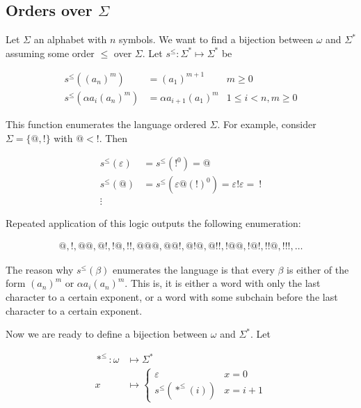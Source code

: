 \documentclass[a4paper, 12pt]{article}
\begin{document}
\subsection{Orders over $\Sigma$}

Let $\Sigma$ an alphabet with $n$ symbols. We want to find a bijection between $\omega$ and
$\Sigma^{*}$ assuming some order $\leq$ over $\Sigma$. Let $s^{\leq} :
\Sigma^{*} \mapsto \Sigma^{*}$ be


\begin{align*}
    s^{\leq} \left( (a_n)^m \right)  &= (a_1)^{m + 1} & m \geq 0\\ 
    s^{\leq} \left( \alpha a_i (a_n)^{m} \right) &= \alpha a_{i+1} (a_1)^{m} & 1
    \leq i < n, m \geq 0
\end{align*}

This function enumerates the language ordered $\Sigma$. For example, consider
$\Sigma = \{@, !\}$ with $@ < !$. Then 

\begin{align*}
    s^{\leq}( \varepsilon ) &= s^{\leq}( !^{0} ) = @\\
    s^{\leq}( @ ) &= s^{\leq}( \varepsilon @ (!)^{0} ) = \varepsilon ! \varepsilon = ~!
    \\ 
    \vdots
\end{align*}

Repeated application of this logic outputs the following enumeration: 

\begin{align*}
    @, !, @@, @!, !@, !!, @@@, @@!, @!@, @!!, !@@, !@!, !!@, !!!, \ldots
\end{align*}

The reason why $s^{\leq}( \beta  )$ enumerates the language is that every $\beta
$ is either of the form $(a_n)^{m}$ or $\alpha a_i (a_n)^{m}$. This is, it is
either a word with only the last character to a certain exponent, or a word with
some subchain before the last character to a certain exponent.

Now we are ready to define a bijection between $\omega$ and $\Sigma^{*}$. Let 

\begin{align*}
    *^{\leq} : \omega &\mapsto \Sigma^{*} \\ 
    x &\mapsto \begin{cases}
        \varepsilon & x = 0 \\ 
        s^{\leq} \left( *^{\leq} \left( i \right)  \right) & x = i + 1
    \end{cases}
\end{align*}
\end{document}
